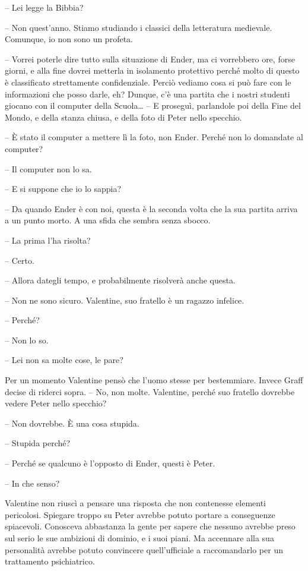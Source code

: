{-- Lei legge la Bibbia?}

{-- Non quest'anno. Stiamo studiando i classici della letteratura
	medievale. Comunque, io non sono un profeta.}

{-- Vorrei poterle dire tutto sulla situazione di Ender, ma ci
	vorrebbero ore, forse giorni, e alla fine dovrei metterla in isolamento
	protettivo perché molto di questo è classificato strettamente
	confidenziale. Perciò vediamo cosa si può fare con le informazioni che
	posso darle, eh? Dunque, c'è una partita che i nostri studenti giocano
	con il computer della Scuola\ldots{} -- E proseguì, parlandole poi della
	Fine del Mondo, e della stanza chiusa, e della foto di Peter nello
	specchio.}

{-- È stato il computer a mettere lì la foto, non Ender. Perché non lo
	domandate al computer?}

{-- Il computer non lo sa.}

{-- E si suppone che io lo sappia?}

{-- Da quando Ender è con noi, questa è la seconda volta che la sua
	partita arriva a un punto morto. A una sfida che sembra senza sbocco.}

{-- La prima l'ha risolta?}

{-- Certo.}

{-- Allora dategli tempo, e probabilmente risolverà anche questa.}

{-- Non ne sono sicuro. Valentine, suo fratello è un ragazzo infelice.}

{-- Perché?}

{-- Non lo so.}

{-- Lei non sa molte cose, le pare?}

{Per un momento Valentine pensò che l'uomo stesse per bestemmiare.
	Invece Graff decise di riderci sopra. -- No, non molte. Valentine,
	perché suo fratello dovrebbe vedere Peter nello specchio?}

{-- Non dovrebbe. È una cosa stupida.}

{-- Stupida perché?}

{-- Perché se qualcuno è l'opposto di Ender, questi è Peter.}

{-- In che senso?}

{Valentine non riuscì a pensare una risposta che non contenesse elementi
	pericolosi. Spiegare troppo su Peter avrebbe potuto portare a
	conseguenze spiacevoli. Conosceva abbastanza la gente per sapere che
	nessuno avrebbe preso sul serio le sue ambizioni di dominio, e i suoi
	piani. Ma accennare alla sua personalità avrebbe potuto convincere
	quell'ufficiale a raccomandarlo per un trattamento psichiatrico.}

